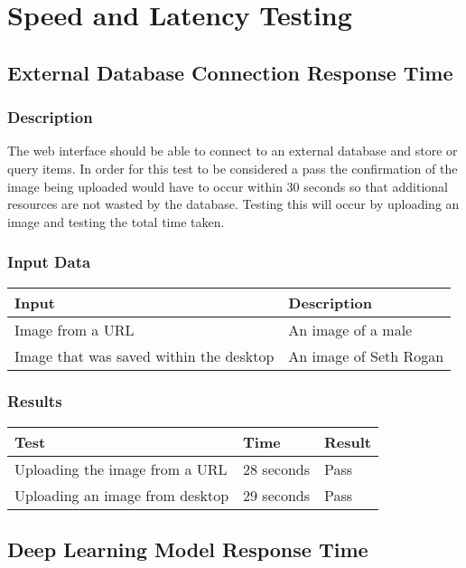 \documentclass{scrreprt}
\begin{document}
\section{Speed and Latency Testing}

\subsection{External Database Connection Response Time}
\subsubsection{Description}
\begin{flushleft}
The web interface should be able to connect to an external database and store or query items. In order for this test to be considered a pass the confirmation of the image being uploaded would have to occur within 30 seconds so that additional resources are not wasted by the database. Testing this will occur by uploading an image and testing the total time taken.
\subsubsection{Input Data}
 \centering
 \begin{tabular}{p{3cm}p{6cm}}
 \hline\hline
 Input & Description\\
 \hline\hline
  Image from a URL & An image of a male  \\
 \hline\hline
  Image that was saved within the desktop & An image of Seth Rogan \\
 \hline
 \end{tabular}
\subsubsection{Results}
\end{flushleft}
 \centering
 \begin{tabular}{||p{1.5cm}|p{1.5cm}|p{1.5cm}||}
 \hline
 \textbf Test & \textbf Time & \textbf Result \\
 \hline\hline
  Uploading the image from a URL & 28 seconds  & Pass\\
 \hline\hline
  Uploading an image from desktop & 29 seconds & Pass\\
 \hline
 \end{tabular}
\vspace{1cm}

\subsection{Deep Learning Model Response Time}
\end{document}
